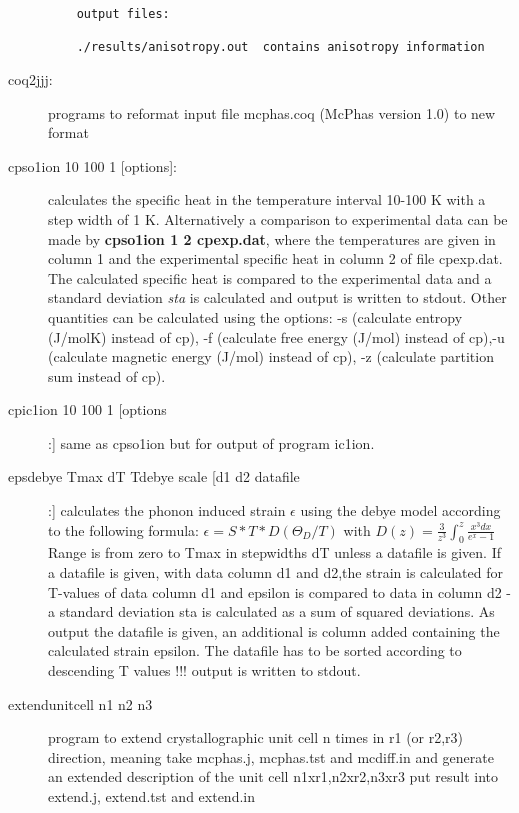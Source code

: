\begin{description}
\begin{verbatim}
    output files:

    ./results/anisotropy.out  contains anisotropy information 
\end{verbatim}
\item [\prg coq2jjj:]         programs to reformat input file {\prg mcphas.coq}
                      ({\prg McPhas} version 1.0) to new format

\item [\prg cpso1ion 10 100 1 {[options]}: ] calculates the specific heat in the temperature %
interval 10-100 K with a step width
of 1 K. Alternatively a comparison to experimental data can be made by {\bf cpso1ion 1 2 %
cpexp.dat},
where the temperatures are given in column 1 and the experimental specific heat in column
2 of file cpexp.dat. The calculated specific heat is compared to the experimental data and
a standard deviation {\em sta} is calculated and output is written to stdout.
Other quantities can be calculated using the options: -s  (calculate entropy  (J/molK) instead %
of cp),
-f (calculate free energy (J/mol) instead of cp),-u  (calculate magnetic energy (J/mol) instead %
of cp),
-z (calculate partition sum instead of cp).
\item[\prg cpic1ion 10 100 1 [options]:] same as {\prg cpso1ion} but for output of program
ic1ion.
					  
\item [\prg epsdebye\index{epsdebye} Tmax dT Tdebye scale [d1 d2 datafile]:]	        
		    calculates the phonon induced strain $\epsilon$ using the debye model
		    according to the following formula:
		    $   \epsilon=S*T*D(\Theta_{D}/T) $
				    with    
		    $D(z)=\frac{3}{z^3}\int_0^z \frac{x^3 dx}{e^x-1}$
                 Range is from zero to Tmax in stepwidths dT
		 unless a datafile is given. 
                 If a  datafile is given, with data column d1 and d2,the strain
                 is calculated for T-values of data column d1 and epsilon
		  is compared to data in column d2 - a standard 
                 deviation sta is calculated as a sum of squared deviations.
                 As output the datafile is given, an additional is column added 
		 containing the calculated strain epsilon. The datafile has to
		 be sorted according to descending T values !!!
                 output is written to stdout.

\item [\prg extendunitcell\index{extendunitcell} n1 n2 n3]program to extend crystallographic %
unit cell n 
                times in r1 (or r2,r3) direction, meaning take mcphas.j, mcphas.tst 
                and mcdiff.in and generate an extended description of the unit %
cell 
                n1xr1,n2xr2,n3xr3 put result into extend.j, extend.tst and extend.in


\end{description}
